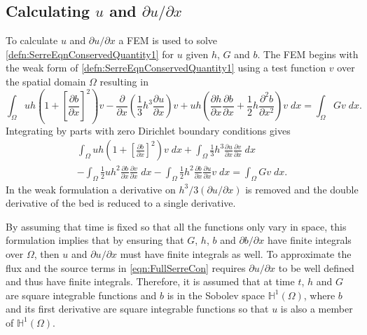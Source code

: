 \documentclass[times]{elsarticle}
\begin{document}
\subsection{Calculating $u$ and $\partial u / \partial x$}
To calculate $u$ and $\partial u / \partial x$ a FEM is used to solve \eqref{defn:SerreEqnConservedQuantity1} for $u$ given $h$, $G$ and $b$. The FEM begins with the weak form of \eqref{defn:SerreEqnConservedQuantity1} using a test function $v$ over the spatial domain $\Omega$ resulting in
\begin{equation*}
 \int_{\Omega } uh \left(1 +  \left[\frac{\partial b}{\partial x}\right]^2 \right) v - \frac{\partial}{\partial x}\left(\frac{1}{3}h^3  \frac{\partial {u}}{\partial x}\right) v  + uh \left(\frac{\partial h}{\partial x}\frac{\partial b}{\partial x} + \frac{1}{2}h\frac{\partial^2 b}{\partial x^2} \right) v \; dx = \int_{\Omega } G v \; dx.
\end{equation*}
Integrating by parts with zero Dirichlet boundary conditions gives
\begin{multline}
\int_{\Omega } uh \left(1 + \left[\frac{\partial b}{\partial x}\right]^2 \right) v \; dx +  \int_{\Omega } \frac{1}{3}h^3  \frac{\partial {u}}{\partial x} \frac{\partial v}{\partial x} \; dx  \\ - 
\int_{\Omega }   \frac{1}{2} u h^2\frac{\partial b}{\partial x}  \frac{\partial v }{\partial x}\; dx - 
\int_{\Omega }   \frac{1}{2}h^2\frac{\partial b}{\partial x}  \frac{\partial u }{\partial x}v \; dx = \int_{\Omega } G v \; dx.
\label{eqn:WeakFormDomain}
\end{multline}
In the weak formulation a derivative on $h^3/3\left(\partial u / \partial x\right)$ is removed and the double derivative of the bed is reduced to a single derivative.

By assuming that time is fixed so that all the functions only vary in space, this formulation implies that by ensuring that $G$, $h$, $b$ and $\partial b / \partial x$ have finite integrals over $\Omega$, then $u$ and $\partial u / \partial x$ must have finite integrals as well. To approximate the flux and the source terms in \eqref{eqn:FullSerreCon} requires $\partial u / \partial x$ to be well defined and thus have finite integrals. Therefore, it is assumed that at time $t$, $h$ and $G$ are square integrable functions and $b$ is in the Sobolev space $\mathbb{H}^{1}(\Omega)$, where $b$ and its first derivative are square integrable functions so that $u$ is also a member of $\mathbb{H}^{1}(\Omega)$.
\end{document}
